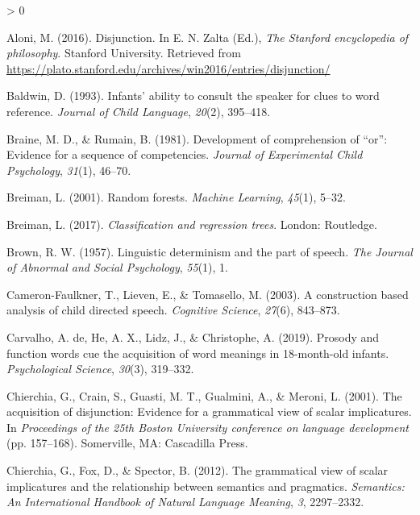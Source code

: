 \documentclass[
  english,
  ,man,floatsintext]{apa6}
\newlength{\cslhangindent}
\newenvironment{CSLReferences}[2] %
 {%
  \setlength{\parindent}{0pt}
  \ifodd #1 \everypar{\setlength{\hangindent}{\cslhangindent}}\ignorespaces\fi
  \ifnum #2 > 0
  \setlength{\parskip}{#2\baselineskip}
  \fi
 }%
 {}
\begin{document}
\hypertarget{refs}{}
\begin{CSLReferences}{1}{0}
\leavevmode\hypertarget{ref-Aloni2016}{}%
Aloni, M. (2016). Disjunction. In E. N. Zalta (Ed.), \emph{The {S}tanford encyclopedia of philosophy}. Stanford University. Retrieved from \url{https://plato.stanford.edu/archives/win2016/entries/disjunction/}

\leavevmode\hypertarget{ref-baldwin1993infants}{}%
Baldwin, D. (1993). Infants' ability to consult the speaker for clues to word reference. \emph{Journal of Child Language}, \emph{20}(2), 395--418.

\leavevmode\hypertarget{ref-braine1981development}{}%
Braine, M. D., \& Rumain, B. (1981). Development of comprehension of {``or''}: Evidence for a sequence of competencies. \emph{Journal of Experimental Child Psychology}, \emph{31}(1), 46--70.

\leavevmode\hypertarget{ref-breiman2001random}{}%
Breiman, L. (2001). Random forests. \emph{Machine Learning}, \emph{45}(1), 5--32.

\leavevmode\hypertarget{ref-breiman2017classification}{}%
Breiman, L. (2017). \emph{Classification and regression trees}. London: Routledge.

\leavevmode\hypertarget{ref-brown1957linguistic}{}%
Brown, R. W. (1957). Linguistic determinism and the part of speech. \emph{The Journal of Abnormal and Social Psychology}, \emph{55}(1), 1.

\leavevmode\hypertarget{ref-cameron2003construction}{}%
Cameron-Faulkner, T., Lieven, E., \& Tomasello, M. (2003). A construction based analysis of child directed speech. \emph{Cognitive Science}, \emph{27}(6), 843--873.

\leavevmode\hypertarget{ref-de2019prosody}{}%
Carvalho, A. de, He, A. X., Lidz, J., \& Christophe, A. (2019). Prosody and function words cue the acquisition of word meanings in 18-month-old infants. \emph{Psychological Science}, \emph{30}(3), 319--332.

\leavevmode\hypertarget{ref-chierchia2001acquisition}{}%
Chierchia, G., Crain, S., Guasti, M. T., Gualmini, A., \& Meroni, L. (2001). The acquisition of disjunction: Evidence for a grammatical view of scalar implicatures. In \emph{Proceedings of the 25th {B}oston {U}niversity conference on language development} (pp. 157--168). Somerville, MA: Cascadilla Press.

\leavevmode\hypertarget{ref-chierchia2012grammatical}{}%
Chierchia, G., Fox, D., \& Spector, B. (2012). The grammatical view of scalar implicatures and the relationship between semantics and pragmatics. \emph{Semantics: An International Handbook of Natural Language Meaning}, \emph{3}, 2297--2332.


\end{CSLReferences}
\end{document}
